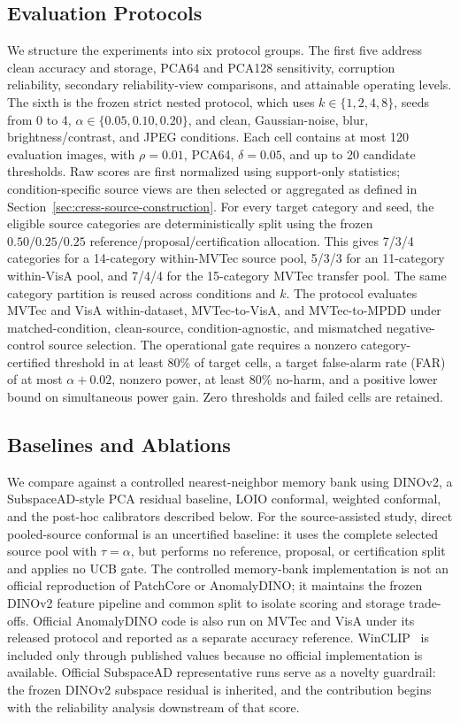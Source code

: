 \subsection{Evaluation Protocols}
We structure the experiments into six protocol groups. The first five address clean accuracy and storage, PCA64 and PCA128 sensitivity, corruption reliability, secondary reliability-view comparisons, and attainable operating levels. The sixth is the frozen strict nested protocol, which uses $k\in\{1,2,4,8\}$, seeds from 0 to 4, $\alpha\in\{0.05,0.10,0.20\}$, and clean, Gaussian-noise, blur, brightness/contrast, and JPEG conditions. Each cell contains at most 120 evaluation images, with $\rho=0.01$, PCA64, $\delta=0.05$, and up to 20 candidate thresholds. Raw scores are first normalized using support-only statistics; condition-specific source views are then selected or aggregated as defined in Section~\ref{sec:cress-source-construction}. For every target category and seed, the eligible source categories are deterministically split using the frozen $0.50/0.25/0.25$ reference/proposal/certification allocation. This gives 7/3/4 categories for a 14-category within-MVTec source pool, 5/3/3 for an 11-category within-VisA pool, and 7/4/4 for the 15-category MVTec transfer pool. The same category partition is reused across conditions and $k$. The protocol evaluates MVTec and VisA within-dataset, MVTec-to-VisA, and MVTec-to-MPDD under matched-condition, clean-source, condition-agnostic, and mismatched negative-control source selection. The operational gate requires a nonzero category-certified threshold in at least 80\% of target cells, a target false-alarm rate (FAR) of at most $\alpha+0.02$, nonzero power, at least 80\% no-harm, and a positive lower bound on simultaneous power gain. Zero thresholds and failed cells are retained.

\subsection{Baselines and Ablations}
We compare against a controlled nearest-neighbor memory bank using DINOv2, a SubspaceAD-style PCA residual baseline, LOIO conformal, weighted conformal, and the post-hoc calibrators described below. For the source-assisted study, direct pooled-source conformal is an uncertified baseline: it uses the complete selected source pool with $\tau=\alpha$, but performs no reference, proposal, or certification split and applies no UCB gate. The controlled memory-bank implementation is not an official reproduction of PatchCore or AnomalyDINO; it maintains the frozen DINOv2 feature pipeline and common split to isolate scoring and storage trade-offs. Official AnomalyDINO code is also run on MVTec and VisA under its released protocol and reported as a separate accuracy reference. WinCLIP~\cite{winclip2023} is included only through published values because no official implementation is available. Official SubspaceAD representative runs serve as a novelty guardrail: the frozen DINOv2 subspace residual is inherited, and the contribution begins with the reliability analysis downstream of that score.

